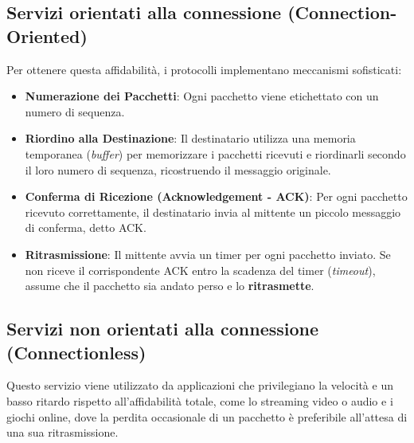 \subsection{Servizi orientati alla connessione (Connection-Oriented)}
Per ottenere questa affidabilità, i protocolli implementano meccanismi sofisticati:
\begin{itemize}
    \item \textbf{Numerazione dei Pacchetti}: Ogni pacchetto viene etichettato con un numero di sequenza.
    \item \textbf{Riordino alla Destinazione}: Il destinatario utilizza una memoria temporanea (\textit{buffer}) per memorizzare i pacchetti ricevuti e riordinarli secondo il loro numero di sequenza, ricostruendo il messaggio originale.
    \item \textbf{Conferma di Ricezione (Acknowledgement - ACK)}: Per ogni pacchetto ricevuto correttamente, il destinatario invia al mittente un piccolo messaggio di conferma, detto ACK.
    \item \textbf{Ritrasmissione}: Il mittente avvia un timer per ogni pacchetto inviato. Se non riceve il corrispondente ACK entro la scadenza del timer (\textit{timeout}), assume che il pacchetto sia andato perso e lo \textbf{ritrasmette}.
\end{itemize}

\subsection{Servizi non orientati alla connessione (Connectionless)}
Questo servizio viene utilizzato da applicazioni che privilegiano la velocità e un basso ritardo rispetto all'affidabilità totale, come lo streaming video o audio e i giochi online, dove la perdita occasionale di un pacchetto è preferibile all'attesa di una sua ritrasmissione.

